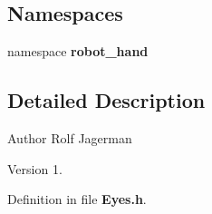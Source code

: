 \subsection*{Namespaces}
\begin{DoxyCompactItemize}
\item 
namespace {\bf robot\-\_\-hand}
\end{DoxyCompactItemize}


\subsection{Detailed Description}
\begin{DoxyAuthor}{Author}
Rolf Jagerman 
\end{DoxyAuthor}
\begin{DoxyVersion}{Version}
1. 
\end{DoxyVersion}


Definition in file {\bf Eyes.\-h}.

